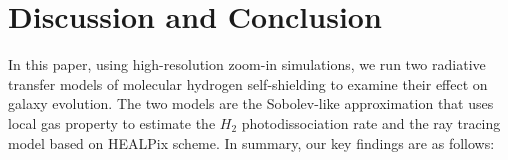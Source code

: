 \documentclass[linenumbers, twocolumn]{aastex631}
\begin{document}



\section{Discussion and Conclusion}
\label{sec:conclusion}

In this paper, using high-resolution zoom-in simulations, we run two radiative transfer models of molecular hydrogen self-shielding to examine their effect on galaxy evolution. The two models are the Sobolev-like approximation that uses local gas property to estimate the $H_{2}$ photodissociation rate and the ray tracing model based on HEALPix scheme. In summary, our key findings are as follows:
\end{document}
